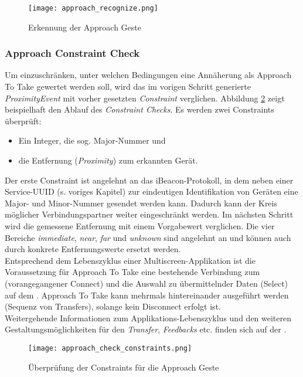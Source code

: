 {\begin{figure}[h]
\texttt{[image: approach\_recognize.png]}
\caption{Erkennung der Approach Geste}
\label{recognize_approach}
\end{figure}

\subsubsection*{Approach Constraint Check}
Um einzuschränken, unter welchen Bedingungen eine Annäherung als Approach To Take gewertet werden soll, wird das im vorigen Schritt generierte \textit{ProximityEvent} mit vorher gesetzten \textit{Constraint} verglichen. Abbildung \ref{check_approach_constraints} zeigt beispielhaft den Ablauf des \textit{Constraint Checks}. Es werden zwei Constraints überprüft:
\begin{itemize}
\item Ein Integer, die sog. Major-Nummer und
\item die Entfernung (\textit{Proximity}) zum erkannten Gerät.
\end{itemize}
Der erste Constraint ist angelehnt an das iBeacon-Protokoll, in dem neben einer Service-UUID (s. voriges Kapitel) zur eindeutigen Identifikation von Geräten eine Major- und Minor-Nummer gesendet werden kann. Dadurch kann der Kreis möglicher Verbindungspartner weiter eingeschränkt werden. 
Im nächsten Schritt wird die gemessene Entfernung mit einem Vorgabewert verglichen. Die vier Bereiche \textit{immediate}, \textit{near}, \textit{far} und \textit{unknown} sind angelehnt an \cite{Marquardt2015} und können auch durch konkrete Entfernungswerte ersetzt werden.\\

Entsprechend dem Lebenszyklus einer Multiscreen-Applikation ist die Voraussetzung
für Approach To Take eine bestehende Verbindung zum \sendev{} (vorangegangener Connect) und die Auswahl zu übermittelnder Daten (Select) auf dem \sendev{}. Approach To Take kann mehrmals hintereinander ausgeführt werden (Sequenz von Transfers), solange kein Disconnect erfolgt ist.\\

Weitergehende Informationen zum Applikations-Lebenszyklus und den weiteren
Gestaltungsmöglichkeiten für den \textit{Transfer}, \textit{Feedbacks} etc. finden sich
auf der \developerpage.

\begin{figure}[h]
\texttt{[image: approach\_check\_constraints.png]}
\caption{Überprüfung der Constraints für die Approach Geste}
\label{check_approach_constraints}
\end{figure}
}


\newcommand{\authors}{Horst Schneider, Hochschule Mannheim\\
Dominick Madden, Hochschule Mannheim\\
Valentina Burjan, Hochschule Mannheim}
\newcommand{\versionhistory}{20.02.2017}
\newcommand{\dateofcreation}{15.08.2015}
\newcommand{\comments}{...}
\newcommand{\questions}{...}


